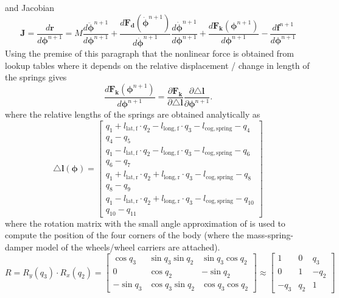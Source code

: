 and Jacobian
\begin{equation}\label{eq:JacobiNonlinForce}
	\boldsymbol{J} = \frac{d\boldsymbol{r}}{d\boldsymbol{\phi}^{n+1}} = M \frac{d \ddot{\boldsymbol{\phi}}^{n+1}}{d \boldsymbol{\phi}^{n+1}} + \frac{d \boldsymbol{F_d}(\dot{\boldsymbol{\phi}}^{n+1})}{d \dot{\boldsymbol{\phi}}^{n+1}}\frac{d \dot{\boldsymbol{\phi}}^{n+1}}{d 
	\boldsymbol{\phi}^{n+1}} + \frac{d \boldsymbol{F_k}(\boldsymbol{\phi}^{n+1})}{d \boldsymbol{\phi}^{n+1}} -  \frac{d \boldsymbol{f}^{n+1}}{d \boldsymbol{\phi}^{n+1}}
\end{equation}
Using the premise of this paragraph that the nonlinear force is obtained from lookup tables where it depends on the relative displacement / change in length of the springs gives
\begin{equation}\label{eq:ForceDeriv}
	\frac{d \boldsymbol{F_k}(\boldsymbol{\phi}^{n+1})}{d \boldsymbol{\phi}^{n+1}} = \frac{\partial \boldsymbol{F_k}}{\partial \triangle\boldsymbol{l}} \frac{\partial \triangle\boldsymbol{l}}{\partial \boldsymbol{\phi}^{n+1}}.
\end{equation}
where the relative lengths of the springs are obtained analytically as
\begin{equation}
	\triangle \boldsymbol{l} (\boldsymbol{\phi}) = 
	\begin{bmatrix}
		q_1 + l_\mathrm{lat,f}\cdot q_2 - l_\mathrm{long,f}\cdot q_3 - l_\mathrm{cog,spring} - q_4 \\
		q_4 - q_5 \\
		q_1 - l_\mathrm{lat,f}\cdot q_2 - l_\mathrm{long,f}\cdot q_3 - l_\mathrm{cog,spring} - q_6 \\
		q_6 - q_7 \\
		q_1 + l_\mathrm{lat,r}\cdot q_2 + l_\mathrm{long,r}\cdot q_3 - l_\mathrm{cog,spring} - q_8 \\
		q_8 - q_9 \\
		q_1 - l_\mathrm{lat,r}\cdot q_2 + l_\mathrm{long,r}\cdot q_3 - l_\mathrm{cog,spring} - q_{10} \\
		q_{10} - q_{11}
	\end{bmatrix}
\end{equation}
where the rotation matrix with the small angle approximation of  is used to compute the position of the four corners of the body (where the mass-spring-damper model of the wheels/wheel carriers are attached).
\begin{equation}
	R = R_y(q_3) \cdot R_x (q_2) = 
	\begin{bmatrix}
		\cos q_3 & \sin q_3 \sin q_2 & \sin q_3 \cos q_2 \\
		0 & \cos q_2 & -\sin q_2 \\ 
		-\sin q_3 & \cos q_3 \sin q_2 & \cos q_3 \cos q_2
	\end{bmatrix} \approx 
	\begin{bmatrix}
		1 & 0 & q_3 \\
		0 & 1 & -q_2 \\
		-q_3 & q_2 & 1 
	\end{bmatrix}
\end{equation}

